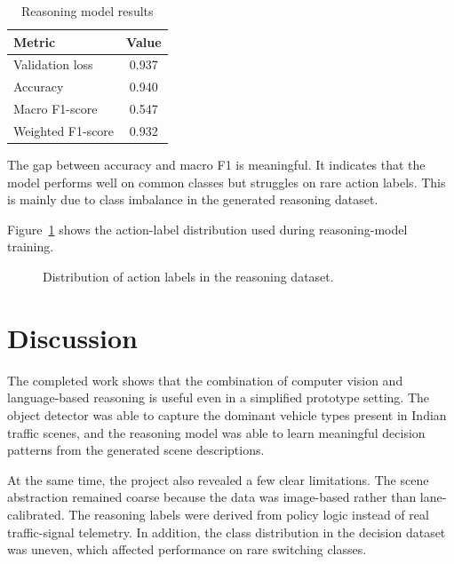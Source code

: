 \documentclass[12pt,a4paper]{report}
\begin{document}
\begin{table}[H]
\centering
\caption{Reasoning model results}
\label{tab:bertresults}
\begin{tabular}{lc}
\toprule
\textbf{Metric} & \textbf{Value} \\
\midrule
Validation loss & 0.937 \\
Accuracy & 0.940 \\
Macro F1-score & 0.547 \\
Weighted F1-score & 0.932 \\
\bottomrule
\end{tabular}
\end{table}

The gap between accuracy and macro F1 is meaningful. It indicates that the model performs well on common classes but struggles on rare action labels. This is mainly due to class imbalance in the generated reasoning dataset.

Figure~\ref{fig:labeldistribution} shows the action-label distribution used during reasoning-model training.

\begin{figure}[H]
\centering
{}
\caption{Distribution of action labels in the reasoning dataset.}
\label{fig:labeldistribution}
\end{figure}

\chapter{Discussion}
The completed work shows that the combination of computer vision and language-based reasoning is useful even in a simplified prototype setting. The object detector was able to capture the dominant vehicle types present in Indian traffic scenes, and the reasoning model was able to learn meaningful decision patterns from the generated scene descriptions.

At the same time, the project also revealed a few clear limitations. The scene abstraction remained coarse because the data was image-based rather than lane-calibrated. The reasoning labels were derived from policy logic instead of real traffic-signal telemetry. In addition, the class distribution in the decision dataset was uneven, which affected performance on rare switching classes.
\end{document}
